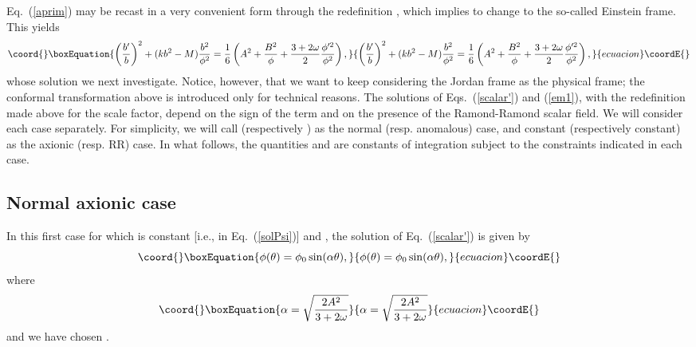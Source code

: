 \documentclass[a4paper,aps,twocolumn,prd,showpacs,nofootinbib]{revtex4}
\begin{document}
Eq.~(\ref{aprim}) may be recast in a very convenient form through the
redefinition \coordHE{}, which implies to change to the
so-called Einstein frame. This yields
\begin{equation}\coord{}\boxEquation{
\left({b'\over b}\right)^2 + ( kb^2-M) {b^2\over\phi^2} = {1\over
6}\left( A^2 +{B^2\over \phi} + {3+2\omega\over 2}
{\phi'^2\over\phi^2}\right), \label{bprim}
}{
\left({b'\over b}\right)^2 + ( kb^2-M) {b^2\over\phi^2} = {1\over
6}\left( A^2 +{B^2\over \phi} + {3+2\omega\over 2}
{\phi'^2\over\phi^2}\right), }{ecuacion}\coordE{}\end{equation}
whose solution we next investigate. Notice, however, that we want to
keep considering the Jordan frame as the physical frame; the conformal
transformation above is introduced only for technical reasons. The
solutions of Eqs.~(\ref{scalar'}) and (\ref{em1}), with the
redefinition made above for the scale factor, depend on the sign of
the term \coordHE{} and on the presence of the Ramond-Ramond scalar
field. We will consider each case separately. For simplicity, we will
call \coordHE{} (respectively \coordHE{}) as the normal
(resp. anomalous) case, and \myHighlight{$\xi =$}\coordHE{} constant (respectively \myHighlight{$\xi \neq$}\coordHE{}
constant) as the axionic (resp. RR) case.  In what follows, the
quantities \coordHE{} and \coordHE{} are constants of integration subject to
the constraints indicated in each case.

\subsection{Normal axionic case}

In this first case for which \myHighlight{$\xi$}\coordHE{} is constant [i.e., \coordHE{} in
Eq.~(\ref{solPsi})] and \coordHE{}, the solution of
Eq.~(\ref{scalar'}) is given by
\begin{equation}\coord{}\boxEquation{
\phi(\theta) = \phi_0\sin(\alpha\theta),\label{phiNA}
}{
\phi(\theta) = \phi_0\sin(\alpha\theta),}{ecuacion}\coordE{}\end{equation}
where
\begin{equation}\coord{}\boxEquation{
\alpha = \sqrt{\frac{2A^2}{3 + 2\omega}}
}{
\alpha = \sqrt{\frac{2A^2}{3 + 2\omega}}
}{ecuacion}\coordE{}\end{equation}
and we have chosen \coordHE{}.
\end{document}
